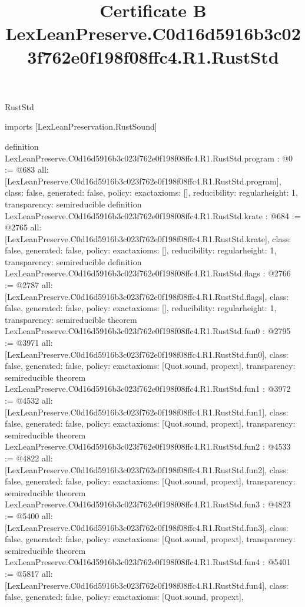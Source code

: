 \begin{lexlean}{RustStd}
\title{Certificate B LexLeanPreserve.C0d16d5916b3c023f762e0f198f08ffc4.R1.RustStd}
\begin{coremodule}
imports [LexLeanPreservation.RustSound]

definition LexLeanPreserve.C0d16d5916b3c023f762e0f198f08ffc4.R1.RustStd.program : @0 := @683 {
  all: [LexLeanPreserve.C0d16d5916b3c023f762e0f198f08ffc4.R1.RustStd.program],
  class: false,
  generated: false,
  policy: exact{axioms: []},
  reducibility: regular{height: 1},
  transparency: semireducible
}
definition LexLeanPreserve.C0d16d5916b3c023f762e0f198f08ffc4.R1.RustStd.krate : @684 := @2765 {
  all: [LexLeanPreserve.C0d16d5916b3c023f762e0f198f08ffc4.R1.RustStd.krate],
  class: false,
  generated: false,
  policy: exact{axioms: []},
  reducibility: regular{height: 1},
  transparency: semireducible
}
definition LexLeanPreserve.C0d16d5916b3c023f762e0f198f08ffc4.R1.RustStd.flags : @2766 := @2787 {
  all: [LexLeanPreserve.C0d16d5916b3c023f762e0f198f08ffc4.R1.RustStd.flags],
  class: false,
  generated: false,
  policy: exact{axioms: []},
  reducibility: regular{height: 1},
  transparency: semireducible
}
theorem LexLeanPreserve.C0d16d5916b3c023f762e0f198f08ffc4.R1.RustStd.fun0 : @2795 := @3971 {
  all: [LexLeanPreserve.C0d16d5916b3c023f762e0f198f08ffc4.R1.RustStd.fun0],
  class: false,
  generated: false,
  policy: exact{axioms: [Quot.sound, propext]},
  transparency: semireducible
}
theorem LexLeanPreserve.C0d16d5916b3c023f762e0f198f08ffc4.R1.RustStd.fun1 : @3972 := @4532 {
  all: [LexLeanPreserve.C0d16d5916b3c023f762e0f198f08ffc4.R1.RustStd.fun1],
  class: false,
  generated: false,
  policy: exact{axioms: [Quot.sound, propext]},
  transparency: semireducible
}
theorem LexLeanPreserve.C0d16d5916b3c023f762e0f198f08ffc4.R1.RustStd.fun2 : @4533 := @4822 {
  all: [LexLeanPreserve.C0d16d5916b3c023f762e0f198f08ffc4.R1.RustStd.fun2],
  class: false,
  generated: false,
  policy: exact{axioms: [Quot.sound, propext]},
  transparency: semireducible
}
theorem LexLeanPreserve.C0d16d5916b3c023f762e0f198f08ffc4.R1.RustStd.fun3 : @4823 := @5400 {
  all: [LexLeanPreserve.C0d16d5916b3c023f762e0f198f08ffc4.R1.RustStd.fun3],
  class: false,
  generated: false,
  policy: exact{axioms: [Quot.sound, propext]},
  transparency: semireducible
}
theorem LexLeanPreserve.C0d16d5916b3c023f762e0f198f08ffc4.R1.RustStd.fun4 : @5401 := @5817 {
  all: [LexLeanPreserve.C0d16d5916b3c023f762e0f198f08ffc4.R1.RustStd.fun4],
  class: false,
  generated: false,
  policy: exact{axioms: [Quot.sound, propext]},
}
\end{coremodule}
\end{lexlean}
